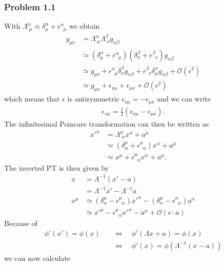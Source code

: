 \documentclass[10pt,a4paper]{book}
\theoremstyle{definition}
\begin{document}
\subsubsection{Problem 1.1}
With $\Lambda^\alpha_{\;\mu}\approx\delta^\alpha_\mu+\epsilon^\alpha_{\;\;\mu}$ we obtain
\begin{align}
g_{\mu\nu}
&=\Lambda^\alpha_{\;\mu}\Lambda^\beta_{\;\nu}g_{\alpha\beta}\\
&\simeq\left(\delta^\alpha_\mu+\epsilon^\alpha_{\;\;\mu}\right)\left(\delta^\beta_\nu+\epsilon^\beta_{\;\;\nu}\right)g_{\alpha\beta}\\
&\simeq g_{\mu\nu}+\epsilon^\alpha_{\;\;\mu}\delta^\beta_\nu g_{\alpha\beta}+\epsilon^\beta_{\;\;\nu}\delta^\alpha_\mu g_{\alpha\beta}+\mathcal{O}(\epsilon^2)\\
&\simeq g_{\mu\nu}+\epsilon_{\nu\mu}+\epsilon_{\mu\nu}+\mathcal{O}(\epsilon^2)
\end{align}
which means that $\epsilon$ is antisymmetric $\epsilon_{\nu\mu}=-\epsilon_{\mu\nu}$ and we can write
\begin{align}
\epsilon_{\nu\mu}=\frac{1}{2}\left(\epsilon_{\nu\mu}-\epsilon_{\mu\nu}\right).
\end{align}
The infinitesimal Poincare transformation can then be written as
\begin{align}
x'^\mu
&=\Lambda^\mu_{\;\alpha}x^\alpha+a^\mu\\
&\simeq\left(\delta^\mu_\alpha+\epsilon^\mu_{\;\;\alpha}\right)x^\alpha+a^\mu\\
&\simeq x^\mu+\epsilon^\mu_{\;\;\alpha}x^\alpha+a^\mu.
\end{align}
The inverted PT is then given by
\begin{align}
x&=\Lambda^{-1}(x'-a)\\
&=\Lambda^{-1}x'-\Lambda^{-1}a\\
x^\mu&\simeq\left(\delta^\mu_\alpha-\epsilon^\mu_{\;\;\alpha}\right)x'^\alpha-\left(\delta^\mu_\alpha-\epsilon^\mu_{\;\;\alpha}\right)a^\alpha\\
&\simeq x'^\mu-\epsilon^\mu_{\;\;\alpha}x'^\alpha-a^\mu+\mathcal{O}(\epsilon\cdot a)
\end{align}
Because of 
\begin{align}
\phi'(x')=\phi(x)
&\quad\Leftrightarrow\quad\phi'(\Lambda x+a)=\phi(x)\\
&\quad\Leftrightarrow\quad\phi'(x)=\phi(\Lambda^{-1}(x-a))
\end{align}
we can now calculate 
\end{document}
